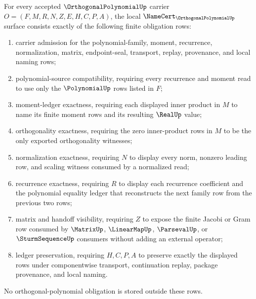 \begin{theorem}
\label{thm:orthogonal-polynomial-namecert-obligations}
For every accepted $\OrthogonalPolynomialUp$ carrier $O=(F,M,R,N,Z,E,H,C,P,A)$, the local $\NameCert_{\OrthogonalPolynomialUp}$ surface consists exactly of the following finite obligation rows:
\begin{enumerate}
\item carrier admission for the polynomial-family, moment, recurrence, normalization, matrix, endpoint-seal, transport, replay, provenance, and local naming rows;
\item polynomial-source compatibility, requiring every recurrence and moment read to use only the $\PolynomialUp$ rows listed in $F$;
\item moment-ledger exactness, requiring each displayed inner product in $M$ to name its finite moment rows and its resulting $\RealUp$ value;
\item orthogonality exactness, requiring the zero inner-product rows in $M$ to be the only exported orthogonality witnesses;
\item normalization exactness, requiring $N$ to display every norm, nonzero leading row, and scaling witness consumed by a normalized read;
\item recurrence exactness, requiring $R$ to display each recurrence coefficient and the polynomial equality ledger that reconstructs the next family row from the previous two rows;
\item matrix and handoff visibility, requiring $Z$ to expose the finite Jacobi or Gram row consumed by $\MatrixUp$, $\LinearMapUp$, $\ParsevalUp$, or $\SturmSequenceUp$ consumers without adding an external operator;
\item ledger preservation, requiring $H,C,P,A$ to preserve exactly the displayed rows under componentwise transport, continuation replay, package provenance, and local naming.
\end{enumerate}
No orthogonal-polynomial obligation is stored outside these rows.
\end{theorem}
